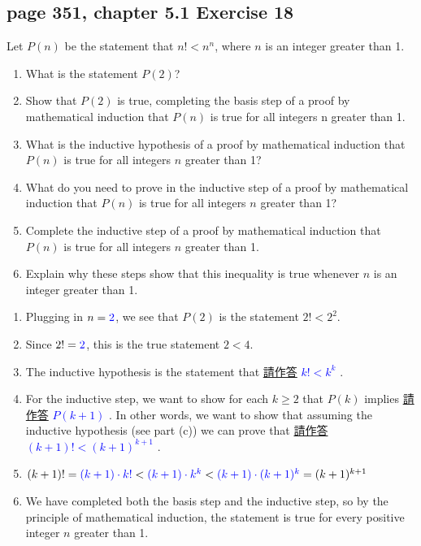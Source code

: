 \documentclass[sigconf]{acmart}
\newcommand{\answer}[2]{%
  \if\relax\detokenize{#2}\relax
    \underline{\mbox{請作答}}%
  \else
    \textcolor{blue}{#2}%
  \fi
}
\begin{document}
\subsection{page 351, chapter 5.1 Exercise 18}
\begin{shaded}
    Let $P(n)$ be the statement that $n! < n^n$, where $n$ is an integer greater than 1.
    \begin{enumerate}[label=(\alph*)]
    	\item What is the statement $P(2)$?
    	\item Show that $P(2)$ is true, completing the basis step of a proof by mathematical induction that $P(n)$ is true for all integers n greater than 1.
    	\item What is the inductive hypothesis of a proof by mathematical induction that $P(n)$ is true for all integers $n$ greater than 1?
        \item What do you need to prove in the inductive step of a proof by mathematical induction that $P(n)$ is true for all integers $n$ greater than 1?
        \item Complete the inductive step of a proof by mathematical induction that $P(n)$ is true for all integers $n$ greater than 1.
        \item Explain why these steps show that this inequality is true whenever $n$ is an integer greater than 1.
    \end{enumerate}
\end{shaded}  
\begin{enumerate}[label=(\alph*)]
	\item Plugging in $n = \answer{5.1.18a}{2}$, we see that $P(2)$ is the statement $2! < 2^2$.
	\item Since $2! = \answer{5.1.18a}{2}$, this is the true statement $2 < 4$.
	\item The inductive hypothesis is the statement that \answer{5.1.18c}{$k!<k^k$}.
    \item For the inductive step, we want to show for each $k \ge 2$ that $P(k)$ implies \answer{5.1.18d}{$P(k+1)$}. In other words, we want to show that assuming the inductive hypothesis (see part (c)) we can prove that \answer{5.1.18e}{$(k+1)!<(k+1)^{k+1}$}.
    \item $(k+1)! = \answer{5.1.18f}{(k+1)\cdot k!} < \answer{5.1.18g}{(k+1)\cdot k^k} < \answer{5.1.18h}{(k+1)\cdot (k+1)^k} = (k + 1)^{k+1}$
    \item We have completed both the basis step and the inductive step, so by the principle of mathematical induction, the statement is true for every positive integer $n$ greater than 1.
\end{enumerate}
\end{document}
